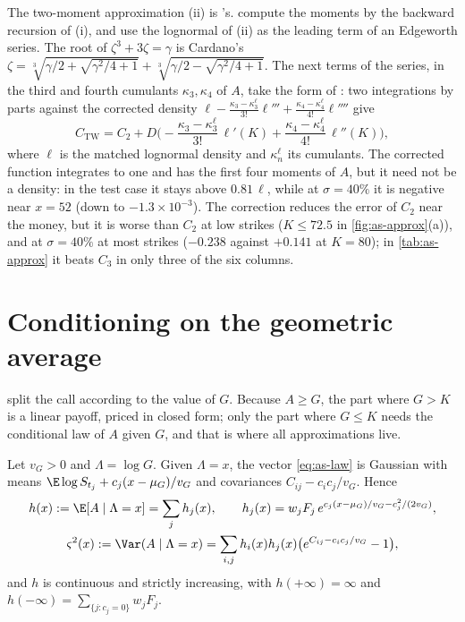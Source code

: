The two-moment approximation (ii) is \textcite{levy-1992}'s. \textcite{turnbull-wakeman}
compute the moments by the backward recursion of (i), and use the lognormal of (ii) as the
leading term of an Edgeworth series. The root of $\zeta^3+3\zeta=\gamma$ is Cardano's
$\zeta=\sqrt[3]{\gamma/2+\sqrt{\gamma^2/4+1}}+\sqrt[3]{\gamma/2-\sqrt{\gamma^2/4+1}}$.
The next terms of the series, in the third and fourth cumulants $\kappa_3,\kappa_4$ of $A$, take
the form of \textcite{jarrow-rudd}: two integrations by parts against the corrected density
$\ell-\frac{\kappa_3-\kappa_3^\ell}{3!}\ell'''+\frac{\kappa_4-\kappa_4^\ell}{4!}\ell''''$ give
\begin{equation}\label{eq:as-edgeworth}
  C_{\mathrm{TW}}=C_2+D\Big(-\frac{\kappa_3-\kappa_3^\ell}{3!}\,\ell'(K)+\frac{\kappa_4-\kappa_4^\ell}{4!}\,\ell''(K)\Big),
\end{equation}
where $\ell$ is the matched lognormal density and $\kappa_n^\ell$ its cumulants. The corrected
function integrates to one and has the first four moments of $A$, but it need not be a density:
in the test case it stays above $0.81\,\ell$, while at $\sigma=40\%$ it is negative near $x=52$
(down to $-1.3\times10^{-3}$). The correction reduces the error of $C_2$ near the money, but it
is worse than $C_2$ at low strikes ($K\le72.5$ in \cref{fig:as-approx}(a)), and at $\sigma=40\%$
at most strikes ($-0.238$ against $+0.141$ at $K=80$); in \cref{tab:as-approx} it beats $C_3$ in
only three of the six columns.

\section{Conditioning on the geometric average}\label{sec:as-curran}

\textcite{curran} split the call according to the value of $G$. Because $A\ge G$, the part
where $G>K$ is a linear payoff, priced in closed form; only the part where $G\le K$ needs the
conditional law of $A$ given $G$, and that is where all approximations live.

\begin{lemma}\label{lem:as-conditional}
Let $v_G>0$ and $\Lambda=\log G$. Given $\Lambda=x$, the vector \eqref{eq:as-law} is Gaussian
with means $\E\log S_{t_j}+c_j(x-\mu_G)/v_G$ and covariances $C_{ij}-c_ic_j/v_G$. Hence
\begin{gather*}
  h(x):=\E[A\mid\Lambda=x]=\sum_jh_j(x),\qquad h_j(x)=w_jF_j\,e^{c_j(x-\mu_G)/v_G-c_j^2/(2v_G)},\\
  \varsigma^2(x):=\Var(A\mid\Lambda=x)=\sum_{i,j}h_i(x)h_j(x)\big(e^{C_{ij}-c_ic_j/v_G}-1\big),
\end{gather*}
and $h$ is continuous and strictly increasing, with $h(+\infty)=\infty$ and
$h(-\infty)=\sum_{\{j:c_j=0\}}w_jF_j$.
\end{lemma}

